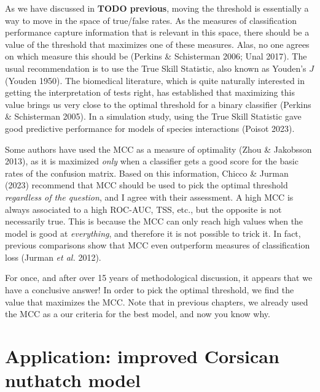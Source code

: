 \documentclass[
  letterpaper,
]{scrbook}
\begin{document}
As we have discussed in \textbf{TODO previous}, moving the threshold is
essentially a way to move in the space of true/false rates. As the
measures of classification performance capture information that is
relevant in this space, there should be a value of the threshold that
maximizes one of these measures. Alas, no one agrees on which measure
this should be (Perkins \& Schisterman 2006; Unal 2017). The usual
recommendation is to use the True Skill Statistic, also known as
Youden's \(J\) (Youden 1950). The biomedical literature, which is quite
naturally interested in getting the interpretation of tests right, has
established that maximizing this value brings us very close to the
optimal threshold for a binary classifier (Perkins \& Schisterman 2005).
In a simulation study, using the True Skill Statistic gave good
predictive performance for models of species interactions (Poisot 2023).

Some authors have used the MCC as a measure of optimality (Zhou \&
Jakobsson 2013), as it is maximized \emph{only} when a classifier gets a
good score for the basic rates of the confusion matrix. Based on this
information, Chicco \& Jurman (2023) recommend that MCC should be used
to pick the optimal threshold \emph{regardless of the question}, and I
agree with their assessment. A high MCC is always associated to a high
ROC-AUC, TSS, etc., but the opposite is not necessarily true. This is
because the MCC can only reach high values when the model is good at
\emph{everything}, and therefore it is not possible to trick it. In
fact, previous comparisons show that MCC even outperform measures of
classification loss (Jurman \emph{et al.} 2012).

For once, and after over 15 years of methodological discussion, it
appears that we have a conclusive answer! In order to pick the optimal
threshold, we find the value that maximizes the MCC. Note that in
previous chapters, we already used the MCC as a our criteria for the
best model, and now you know why.

\section{Application: improved Corsican nuthatch
model}\label{application-improved-corsican-nuthatch-model}

{
\makeatletter
\def\LT@makecaption#1#2#3{%
  \noalign{\smash{\hbox{\kern\textwidth\rlap{\kern\marginparsep
  \parbox[t]{\marginparwidth}{%
    \footnotesize{%
      \vspace{(1.1\baselineskip)}
    #1{#2: }\ignorespaces #3}}}}}}%
    }
\makeatother

\begin{figure}[bt]



\end{figure}%

}
\end{document}
